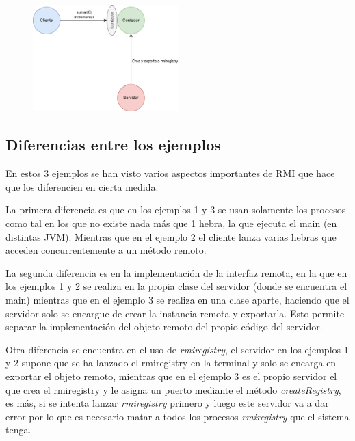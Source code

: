 \documentclass{article}
\begin{document}
\begin{figure}[H]
    \centering
    \includegraphics[width=0.5\textwidth]{imagenes/E3Diagrama.png}
\end{figure}

\newpage

\subsection{Diferencias entre los ejemplos}
En estos 3 ejemplos se han visto varios aspectos importantes de RMI que hace que los diferencien en cierta medida. 

\bigskip

La primera diferencia es que en los ejemplos 1 y 3 se usan solamente los procesos como tal en los que no existe nada más que 1 hebra, la que ejecuta el main (en distintas JVM). Mientras que en el ejemplo 2 el cliente lanza varias hebras que acceden concurrentemente a un método remoto.

\bigskip

La segunda diferencia es en la implementación de la interfaz remota, en la que en los ejemplos 1 y 2 se realiza en la propia clase del servidor (donde se encuentra el main) mientras que en el ejemplo 3 se realiza en una clase aparte, haciendo que el servidor solo se encargue de crear la instancia remota y exportarla. Esto permite separar la implementación del objeto remoto del propio código del servidor.

\bigskip

Otra diferencia se encuentra en el uso de \textit{rmiregistry}, el servidor en los ejemplos 1 y 2 supone que se ha lanzado el rmiregistry en la terminal y solo se encarga en exportar el objeto remoto, mientras que en el ejemplo 3 es el propio servidor el que crea el rmiregistry y le asigna un puerto mediante el método \textit{createRegistry}, es más, si se intenta lanzar \textit{rmiregistry} primero y luego este servidor va a dar error por lo que es necesario matar a todos los procesos \textit{rmiregistry} que el sistema tenga.
\end{document}
